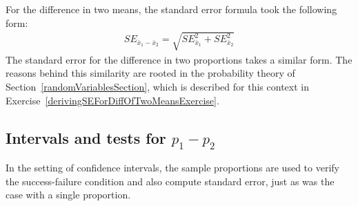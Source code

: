 For the difference in two means, the standard error formula took the following form:
\begin{eqnarray*}
SE_{\bar{x}_{1} - \bar{x}_{2}} = \sqrt{SE_{\bar{x}_1}^2 + SE_{\bar{x}_2}^2}
\end{eqnarray*}
The standard error for the difference in two proportions takes a similar form. The reasons behind this similarity are rooted in the probability theory of Section~\ref{randomVariablesSection}, which is described for this context in Exercise~\vref{derivingSEForDiffOfTwoMeansExercise}.


\subsection{Intervals and tests for $p_1 -p_2$}

In the setting of confidence intervals, the sample proportions are used to verify the success-failure condition and also compute standard error, just as was the case with a single proportion.

